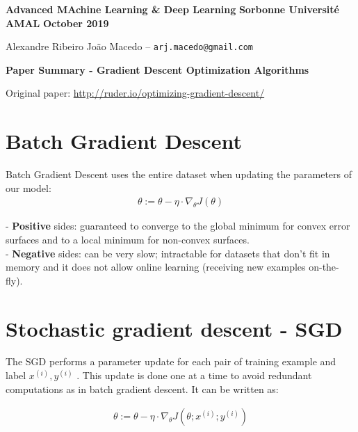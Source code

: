 \documentclass[10pt]{article} %
\theoremstyle{question-style}
\begin{document}
\date{August 2018}
\noindent
\normalsize\textbf{Advanced MAchine Learning \& Deep Learning} \hfill \textbf{Sorbonne Université }\\
\normalsize\textbf{AMAL} \hfill \textbf{October 2019}

{\small Alexandre Ribeiro João Macedo --  \texttt{arj.macedo@gmail.com}}\vspace{20pt}
\centerline{\Large \textbf{Paper Summary - Gradient Descent Optimization Algorithms}}
\vspace{10pt}

\begin{flushleft}

Original paper: \href{http://ruder.io/optimizing-gradient-descent/}{http://ruder.io/optimizing-gradient-descent/}

\section{Batch Gradient Descent}

Batch Gradient Descent uses the entire dataset when updating the parameters of our model:
\begin{align*}
    \theta := \theta - \eta \cdot \nabla_{\theta}J(\theta)    
\end{align*}

- \textbf{Positive} sides: guaranteed to converge to the global minimum for convex error surfaces and to a local minimum for non-convex surfaces. \\

- \textbf{Negative} sides: can be very slow; intractable for datasets that don't fit in memory and it does not allow online learning (receiving new examples on-the-fly).


\section{Stochastic gradient descent - SGD}
The SGD performs a parameter update for each pair of training example and label $x^{(i)},y^{(i)} $ . This update is done one at a time to avoid redundant computations as in batch gradient descent. It can be written as:

\begin{align*}
    \theta := \theta - \eta \cdot \nabla_{\theta} J \left( \theta; x^{(i)};y^{(i)} \right)
\end{align*}


\end{flushleft}
\end{document}
